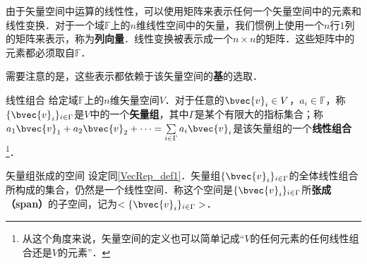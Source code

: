 
由于矢量空间中运算的线性性，可以使用矩阵来表示任何一个矢量空间中的元素和线性变换．对于一个域$\mathbb{F}$上的$n$维线性空间中的矢量，我们惯例上使用一个$n$行$1$列的矩阵来表示，称为\textbf{列向量}．线性变换被表示成一个$n\times n$的矩阵．这些矩阵中的元素都必须取自$\mathbb{F}$．

需要注意的是，这些表示都依赖于该矢量空间的\textbf{基}的选取．

\begin{definition}{线性组合}\label{VecRep_def1}
给定域$\mathbb{F}$上的$n$维矢量空间$V$．对于任意的$\bvec{v}_i\in V$，$a_i\in\mathbb{F}$，称$\{\bvec{v}_i\}_{i\in\Gamma}$是$V$中的一个\textbf{矢量组}，其中$\Gamma$是某个有限大的指标集合；称$a_1\bvec{v}_1+a_2\bvec{v}_2+\cdots=\sum\limits_{i\in\Gamma}a_i\bvec{v}_i$是该矢量组的一个\textbf{线性组合}\footnote{从这个角度来说，矢量空间的定义也可以简单记成“$V$的任何元素的任何线性组合还是$V$的元素”．}．
\end{definition}

\begin{definition}{矢量组张成的空间}
设定同\autoref{VecRep_def1}．矢量组$\{\bvec{v}_i\}_{i\in\Gamma}$的全体线性组合所构成的集合，仍然是一个线性空间．称这个空间是$\{\bvec{v}_i\}_{i\in\Gamma}$所\textbf{张成（span）}的子空间，记为$<\{\bvec{v}_i\}_{i\in\Gamma}>$．
\end{definition}




